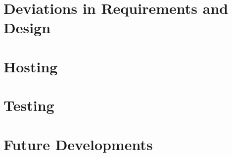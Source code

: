 \chapter{Deviations in Requirements and Design}


\chapter{Hosting}


\chapter{Testing}


\chapter{Future Developments}

